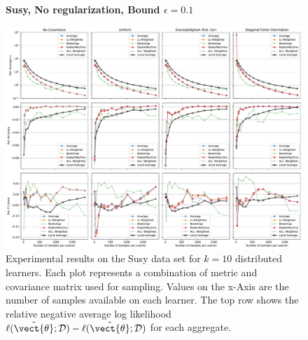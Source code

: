 \begin{landscape}
    \begin{figure}
        \centering
        \textbf{Susy, No regularization, Bound $\epsilon=0.1$}\par\medskip
        \includegraphics[height=\dimexpr \textheight - 1\baselineskip\relax]{kapitel/figures/susy_None_0.1_neg_relative.pdf}
        \caption[Susy plots without regularization and $\epsilon=0.1$]{Experimental results on the Susy data set for $k=10$ distributed learners. Each plot represents a combination of metric and covariance matrix used for sampling. Values on the x-Axis are the number of samples available on each learner. The top row shows the relative negative average log likelihood $\ell(\tilde{\vect{\theta}}; \mathcal{D}) - \ell(\hat{\vect{\theta}}; \mathcal{D})$  for each aggregate.}
        \label{fig:analysis4}
    \end{figure}
    \end{landscape}
